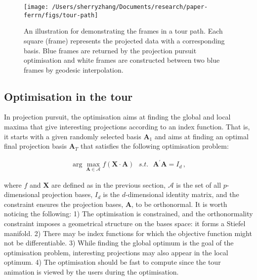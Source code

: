 \begin{Schunk}
\begin{figure}

{\centering \texttt{[image: /Users/sherryzhang/Documents/research/paper-ferrn/figs/tour-path]} 

}

\caption[An illustration for demonstrating the frames in a tour path]{An illustration for demonstrating the frames in a tour path. Each square (frame) represents the projected data with a corresponding basis. Blue frames are returned by the projection pursuit optimisation and white frames are constructed between two blue frames by geodesic interpolation.}\label{fig:tour-path}
\end{figure}
\end{Schunk}

\hypertarget{tour-optim}{%
\subsection{Optimisation in the tour}\label{tour-optim}}

In projection pursuit, the optimisation aims at finding the global and
local maxima that give interesting projections according to an index
function. That is, it starts with a given randomly selected basis
\(\mathbf{A}_1\) and aims at finding an optimal final projection basis
\(\mathbf{A}_T\) that satisfies the following optimisation problem:

\begin{align}
\arg \max_{\mathbf{A} \in \mathcal{A}} f(\mathbf{X} \cdot \mathbf{A})  ~~~ s.t. ~~~ \mathbf{A}^{\prime} \mathbf{A} = I_d \,,
\end{align}

\noindent where \(f\) and \(\mathbf{X}\) are defined as in the previous
section, \(\mathcal{A}\) is the set of all \(p\)-dimensional projection
bases, \(I_d\) is the \(d\)-dimensional identity matrix, and the
constraint ensures the projection bases, \(\mathbf{A}\), to be
orthonormal. It is worth noticing the following: 1) The optimisation is
constrained, and the orthonormality constraint imposes a geometrical
structure on the bases space: it forms a Stiefel manifold. 2) There may
be index functions for which the objective function might not be
differentiable. 3) While finding the global optimum is the goal of the
optimisation problem, interesting projections may also appear in the
local optimum. 4) The optimisation should be fast to compute since the
tour animation is viewed by the users during the optimisation.


